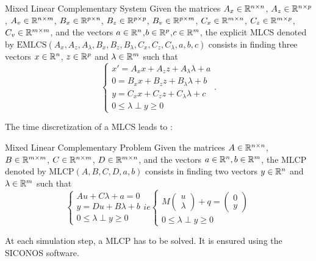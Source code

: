 
\frame
{
\begin{block}{Mixed Linear Complementary System}
  Given the matrices   ${A_{x}} \in \mathbb{R}^{n \times n}$, ${A_{z}} \in \mathbb{R}^{n \times
  p}$, ${A_{v}} \in \mathbb{R}^{n \times m}$, ${B_{x}} \in \mathbb{R}^{p \times n}$, ${B_{z}} \in \mathbb{R}^{p \times
  p}$, ${B_{v}} \in \mathbb{R}^{p \times m}$, ${C_{x}} \in \mathbb{R}^{m \times n}$, ${C_{z}} \in \mathbb{R}^{m \times p}$,${C_{v}} \in \mathbb{R}^{m \times m}$, and
  the vectors  $ {a} \in \mathbb{R}^n$,$ {b}  \in \mathbb{R}^p$,$ {c}  \in \mathbb{R}^m$, the explicit MLCS denoted by
  $\mathrm{EMLCS}(A_{x},A_{z},A_{\lambda},B_{x},B_{z},B_{\lambda},C_{x},C_{z},C_{\lambda},a,b,c)$ consists in finding three vectors $ {x}
  \in \mathbb{R}^n$, $ {z} \in \mathbb{R}^p$ and  $ {\lambda} \in \mathbb{R}^m$ such that
\begin{equation}\label{eq:mlcs2} 
  \begin{cases}
   x' = A_{x} x +A_{z} z +A_{\lambda} \lambda + a  \\
   0 = B_{x} x +B_{z} z + B_{\lambda} \lambda +b \\
   y=C_{x} x+ C_{z}z +C_{\lambda} \lambda +c\\
   {0} \le {\lambda} \perp     y  \ge {0}
  \end{cases}.
\end{equation}
\end{block}
The time discretization of a MLCS leads to :
\begin{block}{Mixed Linear Complementary Problem}
  Given the matrices  ${A} \in \mathbb{R}^{n \times n}$, ${B} \in \mathbb{R}^{m \times m}$, ${C} \in \mathbb{R}^{n \times m}$, ${D} \in \mathbb{R}^{m \times n}$, and the vectors  $ {a} \in \mathbb{R}^n, {b} \in \mathbb{R}^m$, the MLCP denoted by $\mathrm{MLCP}(A,B,C,D,a,b)$ consists in finding two vectors $ {y} \in \mathbb{R}^n$ and  $ {\lambda} \in \mathbb{R}^m$ such that
\begin{equation}
  \begin{cases}
    A u + C \lambda + a =0 \\
    y=Du +B \lambda +b\\
    {0} \le {\lambda} \perp    y   \ge {0}
  \end{cases} ie
  \begin{cases}
    M \left(\begin{array}{c}
    u\\ \lambda
    \end{array}\right)  +q = \left(\begin{array}{c}
    0\\ y
    \end{array}\right)\\
    {0} \le {\lambda} \perp    y   \ge {0}
  \end{cases}
\end{equation}
\end{block}
At each simulation step, a MLCP has to be solved. It is ensured using the SICONOS software.
}
